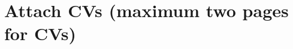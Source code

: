 \documentclass[a4paper, 11pt]{article}
\begin{document}
\begin{footnotesize}





\end{footnotesize}


	
	
	\section{Attach CVs (maximum two pages for CVs)}
	
\end{document}
